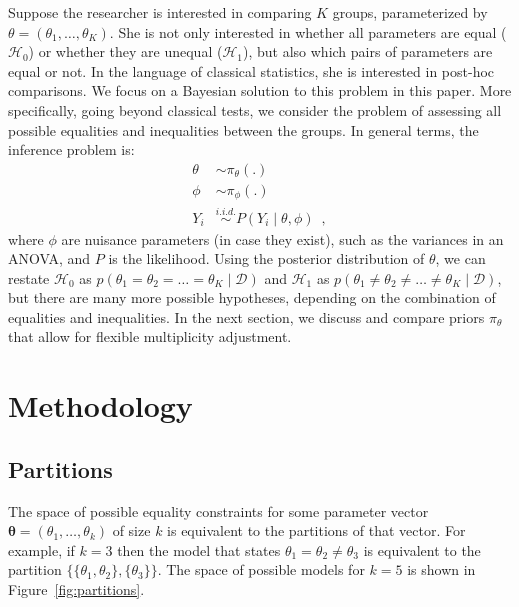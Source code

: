 \documentclass[11pt,a4paper]{article}
\theoremstyle{definition} %
\theoremstyle{case}
\begin{document}
Suppose the researcher is interested in comparing $K$ groups, parameterized by $\theta = (\theta_1, \ldots, \theta_K)$. She is not only interested in whether all parameters are equal ($\mathcal{H}_0$) or whether they are unequal ($\mathcal{H}_1$), but also which pairs of parameters are equal or not. In the language of classical statistics, she is interested in post-hoc comparisons. We focus on a Bayesian solution to this problem in this paper. More specifically, going beyond classical tests, we consider the problem of assessing all possible equalities and inequalities between the groups. In general terms, the inference problem is:
\begin{align*}
    \theta &\sim \pi_{\theta}(.) \\
    \phi &\sim \pi_{\phi}(.) \\
    Y_i &\overset{i.i.d.}{\sim} P(Y_i \mid \theta, \phi)  \enspace ,
\end{align*}
where $\phi$ are nuisance parameters (in case they exist), such as the variances in an ANOVA, and $P$ is the likelihood. Using the posterior distribution of $\theta$, we can restate $\mathcal{H}_0$ as $p(\theta_1 = \theta_2 = \ldots = \theta_K \mid \mathcal{D})$ and $\mathcal{H}_1$ as $p(\theta_1 \neq \theta_2 \neq \ldots \neq \theta_K \mid \mathcal{D})$, but there are many more possible hypotheses, depending on the combination of equalities and inequalities. In the next section, we discuss and compare priors $\pi_{\theta}$ that allow for flexible multiplicity adjustment.


\section{Methodology}

\subsection{Partitions}
The space of possible equality constraints for some parameter vector $\mathbf{\theta} = (\theta_1, \ldots, \theta_k)$ of size $k$ is equivalent to the partitions of that vector. For example, if $k = 3$ then the model that states $\theta_1 = \theta_2 \neq \theta_3$ is equivalent to the partition $\{\{\theta_1, \theta_2\}, \{\theta_3\}\}$. The space of possible models for $k = 5$ is shown in Figure~\ref{fig:partitions}.
\end{document}

